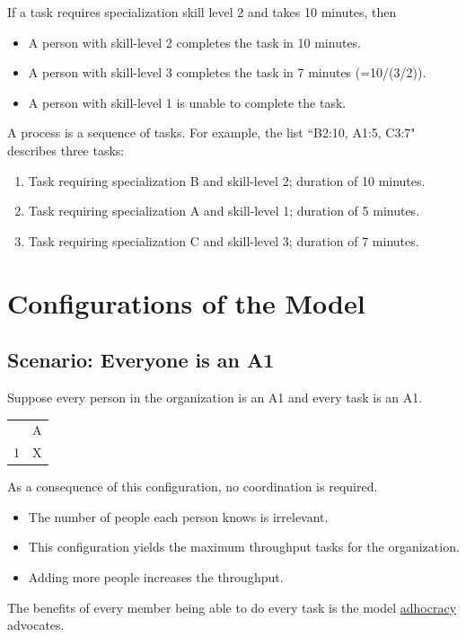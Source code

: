If a task requires specialization skill level 2 and takes 10 minutes, then
\begin{itemize}
    \item A person with skill-level 2 completes the task in 10 minutes.
    \item A person with skill-level 3 completes the task in  7 minutes (=10/(3/2)).
    \item A person with skill-level 1 is unable to complete the task.
\end{itemize}


A process is a sequence of tasks. For example, the list ``B2:10, A1:5, C3:7" describes three tasks: 
\begin{enumerate}
    \item Task requiring specialization B and skill-level 2; duration of 10 minutes.
    \item Task requiring specialization A and skill-level 1; duration of 5 minutes.
    \item Task requiring specialization C and skill-level 3; duration of 7 minutes.    
\end{enumerate}

\section{Configurations of the Model}

\subsection*{Scenario: Everyone is an A1}

Suppose every person in the organization is an A1 and every task is an A1.

\begin{center}
\begin{tabular}{c|c|}
  & A \\
\cline{2-2}
1 & X \\
\cline{2-2}
\end{tabular}
\end{center}

As a consequence of this configuration, no coordination is required.
\begin{itemize}
    \item The number of people each person knows is irrelevant.
    \item This configuration yields the maximum throughput tasks for the organization.
    \item Adding more people increases the throughput.
\end{itemize}
The benefits of every member being able to do every task is the model 
\href{https://en.wikipedia.org/wiki/Adhocracy}{adhocracy} advocates.

